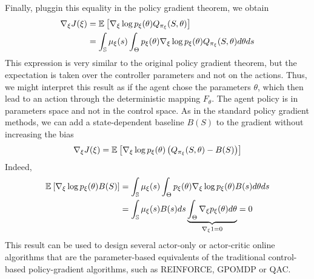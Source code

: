 \documentclass[a4paper,11pt]{article}
\begin{document}
Finally, pluggin this equality in the policy gradient theorem, we obtain 
\begin{equation}
	\begin{split}
		\nabla_\xi J(\xi) &= \mathbb{E}_{}\left[ \nabla_\xi \log p_\xi(\theta) Q_{\pi_\xi}(S,
	\theta) \right]\\
		&= \int_{\mathbb{S}} \mu_\xi(s) \int_\Theta p_\xi(\theta) \nabla_\xi \log
	p_\xi(\theta) Q_{\pi_\xi}(S, \theta) d\theta ds
	\end{split}
\end{equation}
This expression is very similar to the original policy gradient theorem, but
the expectation is taken over the controller parameters and not on the actions.
Thus, we might interpret this result as if the agent chose the parameters
$\theta$, which then lead to an action through the deterministic mapping
$F_\theta$. The agent policy is in parameters space and not in the control
space. As in the standard policy gradient methods, we can add a state-dependent
baseline $B(S)$ to the gradient without increasing the bias
\begin{equation}
	\nabla_\xi J(\xi) = \mathbb{E}_{}\left[ \nabla_\xi \log p_\xi(\theta) \left(Q_{\pi_\xi}(S,
						\theta) - B(S)\right) \right]
\end{equation}
Indeed, 
\begin{equation*}
	\begin{split}
		\mathbb{E}_{}\left[ \nabla_\xi \log p_\xi(\theta) B(S) \right] 
			&= \int_{\mathbb{S}} \mu_\xi(s) \int_\Theta p_\xi(\theta) \nabla_\xi \log
		p_\xi(\theta) B(s) d\theta ds\\
		&= \int_{\mathbb{S}} \mu_\xi(s) B(s) ds \underbrace{\int_\Theta \nabla_\xi p_\xi(\theta)
	d\theta}_{\nabla_\xi 1 = 0} = 0
	\end{split}
\end{equation*}
This result can be used to design several actor-only or actor-critic online
algorithms that are the parameter-based equivalents of the traditional 
control-based policy-gradient algorithms, such as REINFORCE, GPOMDP or QAC.  
\end{document}
